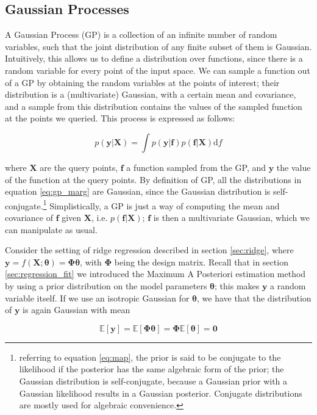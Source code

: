\documentclass[a4paper,11pt]{kth-mag}
\begin{document}
\subsection{Gaussian Processes}
A Gaussian Process (GP) is a collection of an infinite number of random variables, such that the joint distribution of any finite subset of them is Gaussian. Intuitively, this allows us to define a distribution over functions, since there is a random variable for every point of the input space. We can sample a function out of a GP by obtaining the random variables at the points of interest; their distribution is a (multivariate) Gaussian, with a certain mean and covariance, and a sample from this distribution contains the values of the sampled function at the points we queried. This process is expressed as follows:

\begin{equation}
\label{eq:gp_marg}
p(\bm y\vert\bm X)=\int p(\bm y\vert \bm f)p(\bm f\vert\bm X)\text{d}f
\end{equation}

\noindent where $\bm X$ are the query points, $\bm f$ a function sampled from the GP, and $\bm y$ the value of the function at the query points. By definition of GP, all the distributions in equation \ref{eq:gp_marg} are Gaussian, since the Gaussian distribution is self-conjugate.\footnote{referring to equation \ref{eq:map}, the prior is said to be conjugate to the likelihood if the posterior has the same algebraic form of the prior; the Gaussian distribution is self-conjugate, because a Gaussian prior with a Gaussian likelihood results in a Gaussian posterior. Conjugate distributions are mostly used for algebraic convenience.} Simplistically, a GP is just a way of computing the mean and covariance of $\bm f$ given $\bm X$, i.e. $p(\bm f\vert\bm X)$; $\bm f$ is then a multivariate Gaussian, which we can manipulate as usual.

Consider the setting of ridge regression described in section \ref{sec:ridge}, where $\bm y=f(\bm X;\bm\theta)=\bm\Phi\bm\theta$, with $\bm\Phi$ being the design matrix. Recall that in section \ref{sec:regression_fit} we introduced the Maximum A Posteriori estimation method by using a prior distribution on the model parameters $\bm\theta$; this makes $\bm y$ a random variable itself. If we use an isotropic Gaussian for $\bm\theta$, we have that the distribution of $\bm y$ is again Gaussian with mean

\begin{equation}
\mathbb{E}[\bm y]=\mathbb{E}[\bm\Phi\bm\theta]=\bm\Phi\mathbb{E}[\bm\theta]=\bm 0
\end{equation}
\end{document}
